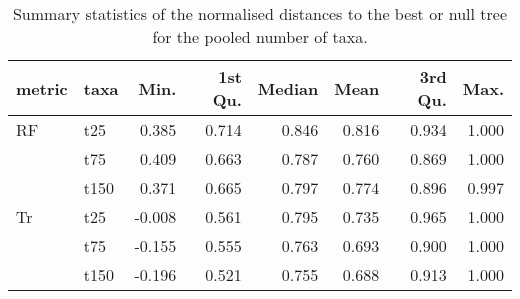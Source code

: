 \begin{table}[ht]
\centering
\begin{tabular}{llrrrrrr}
  \hline
metric & taxa & Min. & 1st Qu. & Median & Mean & 3rd Qu. & Max. \\ 
  \hline
RF & t25 & 0.385 & 0.714 & 0.846 & 0.816 & 0.934 & 1.000 \\ 
   & t75 & 0.409 & 0.663 & 0.787 & 0.760 & 0.869 & 1.000 \\ 
   & t150 & 0.371 & 0.665 & 0.797 & 0.774 & 0.896 & 0.997 \\ 
  Tr & t25 & -0.008 & 0.561 & 0.795 & 0.735 & 0.965 & 1.000 \\ 
   & t75 & -0.155 & 0.555 & 0.763 & 0.693 & 0.900 & 1.000 \\ 
   & t150 & -0.196 & 0.521 & 0.755 & 0.688 & 0.913 & 1.000 \\ 
   \hline
\end{tabular}
\caption{Summary statistics of the normalised distances to the best or null tree for the pooled number of taxa.} 
\label{Tab_pooledtaxa}
\end{table}
